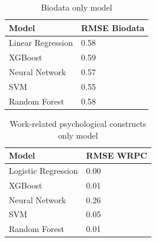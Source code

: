 \documentclass[
  man]{apa7}
\begin{document}
\begin{table}[tbp]

\begin{center}
\begin{threeparttable}

\caption{\label{tab:biotable2}Biodata only model}

\begin{tabular}{ll}
\toprule
Model & \multicolumn{1}{c}{RMSE Biodata}\\
\midrule
Linear Regression & 0.58\\
XGBoost & 0.59\\
Neural Network & 0.57\\
SVM & 0.55\\
Random Forest & 0.58\\
\bottomrule
\end{tabular}

\end{threeparttable}
\end{center}

\end{table}

\begin{table}[tbp]

\begin{center}
\begin{threeparttable}

\caption{\label{tab:wrctable2}Work-related psychological constructs only model}

\begin{tabular}{ll}
\toprule
Model & \multicolumn{1}{c}{RMSE WRPC}\\
\midrule
Logistic Regression & 0.00\\
XGBoost & 0.01\\
Neural Network & 0.26\\
SVM & 0.05\\
Random Forest & 0.01\\
\bottomrule
\end{tabular}

\end{threeparttable}
\end{center}

\end{table}
\end{document}
